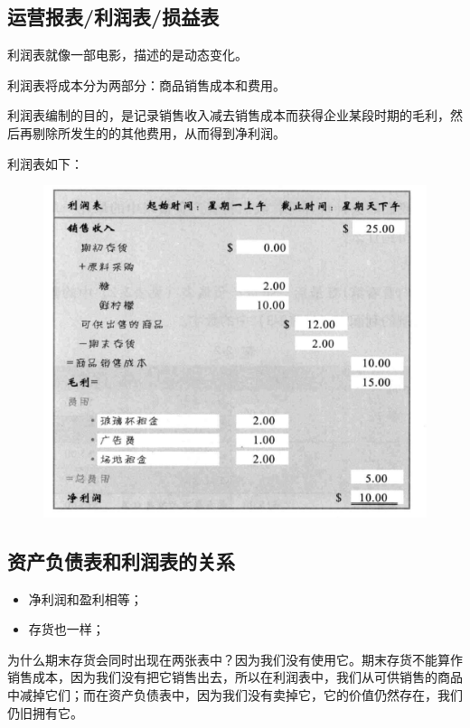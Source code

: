\documentclass[12pt]{article}
\begin{document}
\subsection{运营报表/利润表/损益表}
利润表就像一部电影，描述的是动态变化。

利润表将成本分为两部分：商品销售成本和费用。

利润表编制的目的，是记录销售收入减去销售成本而获得企业某段时期的毛利，然后再剔除所发生的的其他费用，从而得到净利润。

利润表如下：
\begin{figure}[H]
    \centering
    \includegraphics[width=1\textwidth]{fig/accounting_2.png}
\end{figure}

\subsection{资产负债表和利润表的关系}
\begin{itemize}
\setlength{\itemsep}{0pt}
\setlength{\parsep}{0pt}
\setlength{\parskip}{0pt}
    \item 净利润和盈利相等；
    \item 存货也一样；
\end{itemize}

为什么期末存货会同时出现在两张表中？因为我们没有使用它。期末存货不能算作销售成本，因为我们没有把它销售出去，所以在利润表中，我们从可供销售的商品中减掉它们；而在资产负债表中，因为我们没有卖掉它，它的价值仍然存在，我们仍旧拥有它。
\end{document}
